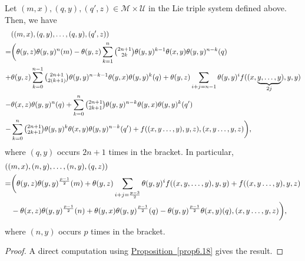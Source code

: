 \documentclass[11pt, twoside]{article}
\begin{document}
\begin{prop}
     Let $(m,x),(q,y),(q',z)\in \mathcal{M}\times \mathcal{U} $ in the Lie triple system defined above. Then, we have \begin{align*}
        & ((m,x),(q,y),\ldots,(q,y),(q',z))\\=& \bigg(\theta(y,z)\theta(y,y)^n(m)-\theta(y,z)\sum\limits_{k=1}^{n}\tbinom{2n+1}{2k}\theta(y,y)^{k-1}\theta(x,y)\theta(y,y)^{n-k}(q)\\+ & \theta(y,z)\sum\limits_{k=0}^{n-1}\tbinom{2n+1}{2(k+1)}\theta(y,y)^{n-k-1}\theta(y,x)\theta(y,y)^k(q) + \theta(y,z)\sum\limits_{i+j=n-1}\theta(y,y)^if((x,\underbrace{y,\ldots,y}_{2j}),y,y)\\ -& \theta(x,z)\theta(y,y)^n(q) + \sum\limits_{k=0}^n\tbinom{2n+1}{2k+1}\theta(y,y)^{n-k}\theta(y,x)\theta(y,y)^k(q') \\-& \sum\limits_{k=0}^n\tbinom{2n+1}{2k+1}\theta(y,y)^k\theta(x,y)\theta(y,y)^{n-k}(q')  + f((x,y\ldots,y),y,z), (x,y\ldots,y,z)\bigg),
     \end{align*} where $(q,y) $ occurs $2n+1$ times in the bracket. In particular, \begin{align}
           ((&m,x),(n,y),\ldots,(n,y),(q,z))\notag\\=&\bigg(\theta(y,z)\theta(y,y)^{\frac{p-1}{2}}(m)+ \theta(y,z)\sum\limits_{i+j=\frac{p-3}{2}}\theta(y,y)^if((x,y,\ldots,y),y,y) + f((x,y\ldots,y),y,z)\notag \\&-\theta(x,z)\theta(y,y)^\frac{p-1}{2}(n)+ \theta(y,x)\theta(y,y)^\frac{p-1}{2}(q)-\theta(y,y)^\frac{p-1}{2}\theta(x,y)(q), (x,y\ldots,y,z)\bigg)\label{eq6.23},
     \end{align} where $(n,y) $ occurs $p$ times in the bracket.
\end{prop}

\begin{proof}
    A direct computation using \hyperref[prop6.18]{Proposition~\ref*{prop6.18}} gives the result.
\end{proof}
\end{document}

